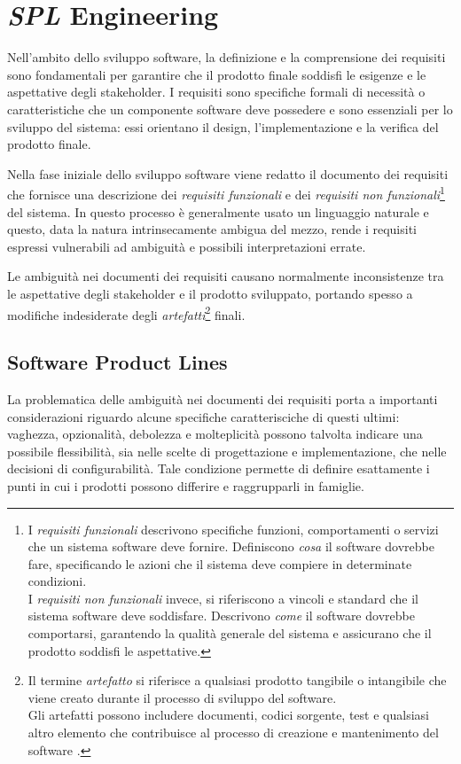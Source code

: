 \documentclass[12pt]{report}
\newcommand{\spl}{\textsl{SPL}\xspace}
\begin{document}
\clearpage\thispagestyle{empty}
\null\newpage




\chapter{\spl Engineering}
\label{ch:sple}
Nell'ambito dello sviluppo software, la definizione e la comprensione dei requisiti sono fondamentali per garantire che il prodotto finale soddisfi le esigenze e le aspettative degli stakeholder. I requisiti sono specifiche formali di necessità o caratteristiche che un componente software deve possedere e sono essenziali per lo sviluppo del sistema: essi orientano il design, l'implementazione e la verifica del prodotto finale.

Nella fase iniziale dello sviluppo software viene redatto il documento dei requisiti che fornisce una descrizione dei \textit{requisiti funzionali} e dei \textit{requisiti non funzionali}\footnote{I \textit{requisiti funzionali} descrivono specifiche funzioni, comportamenti o servizi che un sistema software deve fornire. Definiscono \textit{cosa} il software dovrebbe fare, specificando le azioni che il sistema deve compiere in determinate condizioni.\\
I \textit{requisiti non funzionali} invece, si riferiscono a vincoli e standard che il sistema software deve soddisfare. Descrivono \textit{come} il software dovrebbe comportarsi, garantendo la qualità generale del sistema e assicurano che il prodotto soddisfi le aspettative.} del sistema. In questo processo è generalmente usato un linguaggio naturale e questo, data la natura intrinsecamente ambigua del mezzo, rende i requisiti espressi vulnerabili ad ambiguità e possibili interpretazioni errate.

Le ambiguità nei documenti dei requisiti causano normalmente inconsistenze tra le aspettative degli stakeholder e il prodotto sviluppato, portando spesso a modifiche indesiderate degli \textit{artefatti}\footnote{Il termine \textit{artefatto} si riferisce a qualsiasi prodotto tangibile o intangibile che viene creato durante il processo di sviluppo del software.\\
Gli artefatti possono includere documenti, codici sorgente, test e qualsiasi altro elemento che contribuisce al processo di creazione e mantenimento del software \cite{pohl:bockle:linden}.} finali.


\section{Software Product Lines}
\label{sec:spl}
La problematica delle ambiguità nei documenti dei requisiti porta a importanti considerazioni riguardo alcune specifiche caratterisciche di questi ultimi: vaghezza, opzionalità, debolezza e molteplicità possono talvolta indicare una possibile flessibilità, sia nelle scelte di progettazione e implementazione, che nelle decisioni di configurabilità. Tale condizione permette di definire esattamente i punti in cui i prodotti possono differire e raggrupparli in famiglie.
\end{document}
